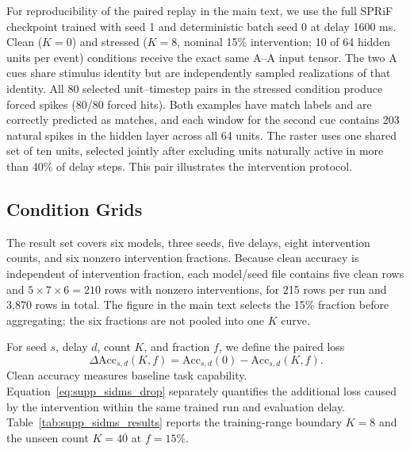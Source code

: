 \documentclass[letterpaper]{article}
\begin{document}
For reproducibility of the paired replay in the main text, we use the full SPRiF checkpoint trained with seed 1 and deterministic batch seed 0 at delay 1600 ms. Clean ($K=0$) and stressed ($K=8$, nominal 15\% intervention; 10 of 64 hidden units per event) conditions receive the exact same A--A input tensor. The two A cues share stimulus identity but are independently sampled realizations of that identity. All 80 selected unit--timestep pairs in the stressed condition produce forced spikes (80/80 forced hits). Both examples have match labels and are correctly predicted as matches, and each window for the second cue contains 203 natural spikes in the hidden layer across all 64 units. The raster uses one shared set of ten units, selected jointly after excluding units naturally active in more than 40\% of delay steps. This pair illustrates the intervention protocol.

\subsection{Condition Grids}
\label{supp:sec:sidms-grids}

The result set covers six models, three seeds, five delays, eight intervention counts, and six nonzero intervention fractions. Because clean accuracy is independent of intervention fraction, each model/seed file contains five clean rows and $5\times7\times6=210$ rows with nonzero interventions, for 215 rows per run and 3,870 rows in total. The figure in the main text selects the 15\% fraction before aggregating; the six fractions are not pooled into one $K$ curve.

For seed $s$, delay $d$, count $K$, and fraction $f$, we define the paired loss
\begin{equation}
\Delta\mathrm{Acc}_{s,d}(K,f)
=\mathrm{Acc}_{s,d}(0)-\mathrm{Acc}_{s,d}(K,f).
\label{eq:supp_sidms_drop}
\end{equation}
Clean accuracy measures baseline task capability. Equation~\eqref{eq:supp_sidms_drop} separately quantifies the additional loss caused by the intervention within the same trained run and evaluation delay. Table~\ref{tab:supp_sidms_results} reports the training-range boundary $K=8$ and the unseen count $K=40$ at $f=15\%$.
\end{document}
